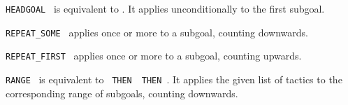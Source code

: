 \begin{isabellebody}
\begin{isamarkuptext}
\begin{description}
  \item \verb|HEADGOAL|~ is equivalent to .
  It applies  unconditionally to the first subgoal.

  \item \verb|REPEAT_SOME|~ applies  once or
  more to a subgoal, counting downwards.

  \item \verb|REPEAT_FIRST|~ applies  once or
  more to a subgoal, counting upwards.

  \item \verb|RANGE|~ is equivalent to
  ~\verb|THEN|~~\verb|THEN|~.  It applies the given list of tactics to the
  corresponding range of subgoals, counting downwards.

  \end{description}%
\end{isamarkuptext}%
\isamarkuptrue%
%
\endisatagmlref
{\isafoldmlref}%
%
\isadelimmlref
%
\endisadelimmlref
%
\isadelimtheory
%
\endisadelimtheory
%
\isatagtheory
{}\isamarkupfalse%
%
\endisatagtheory
{\isafoldtheory}%
%
\isadelimtheory
%
\endisadelimtheory
\isanewline
\end{isabellebody}%
